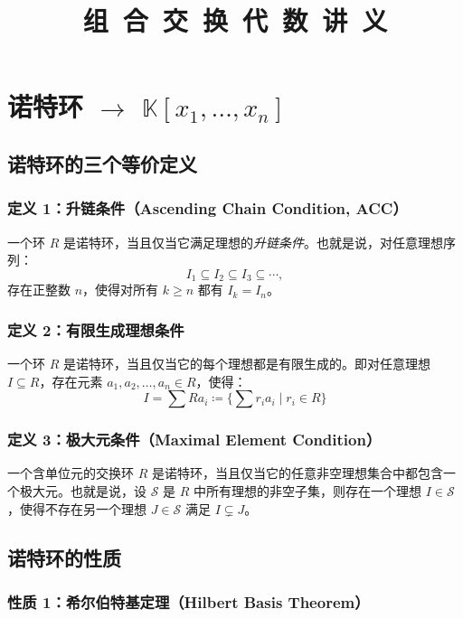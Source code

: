 \documentclass[12pt,a4paper]{ctexbook} %
\title{{\kaishu\fontsize{48}{60}\selectfont 组~合~交~换~代~数~讲~义}} %
\numberwithin{figure}{section}
\theoremstyle{problemstyle}
\numberwithin{equation}{section} %
\begin{document}
\maketitle

\section{诺特环 $\rightarrow$ $\mathbb{K}[x_1, \ldots, x_n]$}
\subsection{诺特环的三个等价定义}
\subsubsection*{定义 1：升链条件（Ascending Chain Condition, ACC）}

一个环 $ R $ 是诺特环，当且仅当它满足理想的\emph{升链条件}。也就是说，对任意理想序列：
$$
I_1 \subseteq I_2 \subseteq I_3 \subseteq \cdots,
$$
存在正整数 $ n $，使得对所有 $ k \geq n $ 都有 $ I_k = I_n $。

\subsubsection*{定义 2：有限生成理想条件}

一个环 $ R $ 是诺特环，当且仅当它的每个理想都是有限生成的。即对任意理想 $ I \subseteq R $，存在元素 $ a_1, a_2, \dots, a_n \in R $，使得：
$$
I = \sum R a_i \coloneqq \{ \sum r_i a_i \mid r_i \in R \}
$$

\subsubsection*{定义 3：极大元条件（Maximal Element Condition）}

一个含单位元的交换环 $ R $ 是诺特环，当且仅当它的任意非空理想集合中都包含一个极大元。也就是说，设 $\mathcal{S}$ 是 $ R $ 中所有理想的非空子集，则存在一个理想 $ I \in \mathcal{S} $，使得不存在另一个理想 $ J \in \mathcal{S} $ 满足 $ I \subsetneq J $。

\subsection{诺特环的性质}

\subsubsection*{性质 1：希尔伯特基定理（Hilbert Basis Theorem）}
\end{document}
